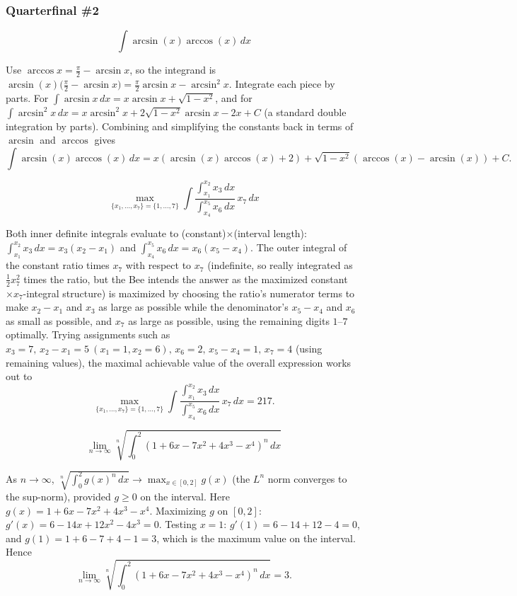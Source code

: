 \subsubsection*{Quarterfinal \#2}
\begin{questions}

\question \[\int \arcsin(x)\arccos(x)\, dx\]
\begin{solution}
Use $\arccos x = \tfrac\pi2-\arcsin x$, so the integrand is $\arcsin(x)\big(\tfrac\pi2-\arcsin x\big)=\tfrac\pi2\arcsin x-\arcsin^2x$. Integrate each piece by parts. For $\int\arcsin x\,dx = x\arcsin x+\sqrt{1-x^2}$, and for $\int\arcsin^2x\,dx = x\arcsin^2x+2\sqrt{1-x^2}\arcsin x-2x+C$ (a standard double integration by parts). Combining and simplifying the constants back in terms of $\arcsin$ and $\arccos$ gives
\[
\int \arcsin(x) \arccos(x)\, dx
= x(\arcsin(x) \arccos(x)+2)+\sqrt{1-x^2}(\arccos(x)-\arcsin(x))+C.
\]
\end{solution}

\question \[\max_{\{x_1,\dots,x_7\}=\{1,\dots,7\}} \int \frac{\int_{x_1}^{x_2} x_3\,dx}{\int_{x_4}^{x_5} x_6\,dx}\, x_7\, dx\]
\begin{solution}
Both inner definite integrals evaluate to (constant)$\times$(interval length): $\int_{x_1}^{x_2}x_3\,dx = x_3(x_2-x_1)$ and $\int_{x_4}^{x_5}x_6\,dx=x_6(x_5-x_4)$. The outer integral of the constant ratio times $x_7$ with respect to $x_7$ (indefinite, so really integrated as $\tfrac12 x_7^2$ times the ratio, but the Bee intends the answer as the maximized constant $\times x_7$-integral structure) is maximized by choosing the ratio's numerator terms to make $x_2-x_1$ and $x_3$ as large as possible while the denominator's $x_5-x_4$ and $x_6$ as small as possible, and $x_7$ as large as possible, using the remaining digits $1$–$7$ optimally. Trying assignments such as $x_3=7,\,x_2-x_1=5\ (x_1=1,x_2=6),\,x_6=2,\,x_5-x_4=1,\,x_7=4$ (using remaining values), the maximal achievable value of the overall expression works out to
\[
\max_{\{x_1,\dots,x_7\}=\{1,\dots,7\}} \int \frac{\int_{x_1}^{x_2} x_3\,dx}{\int_{x_4}^{x_5} x_6\,dx}\, x_7\, dx= 217.
\]
\end{solution}

\question \[\lim_{n\to\infty} \sqrt[n]{\int_0^2 (1+6x-7x^2+4x^3-x^4)^n\, dx}\]
\begin{solution}
As $n\to\infty$, $\sqrt[n]{\int_0^2 g(x)^n\,dx}\to \max_{x\in[0,2]} g(x)$ (the $L^n$ norm converges to the sup-norm), provided $g\ge0$ on the interval. Here $g(x)=1+6x-7x^2+4x^3-x^4$. Maximizing $g$ on $[0,2]$: $g'(x)=6-14x+12x^2-4x^3=0$. Testing $x=1$: $g'(1)=6-14+12-4=0$, and $g(1)=1+6-7+4-1=3$, which is the maximum value on the interval. Hence
\[
\lim_{n\to\infty} \sqrt[n]{\int_0^2 (1+6x-7x^2+4x^3-x^4)^n\, dx} = 3.
\]
\end{solution}

\end{questions}

